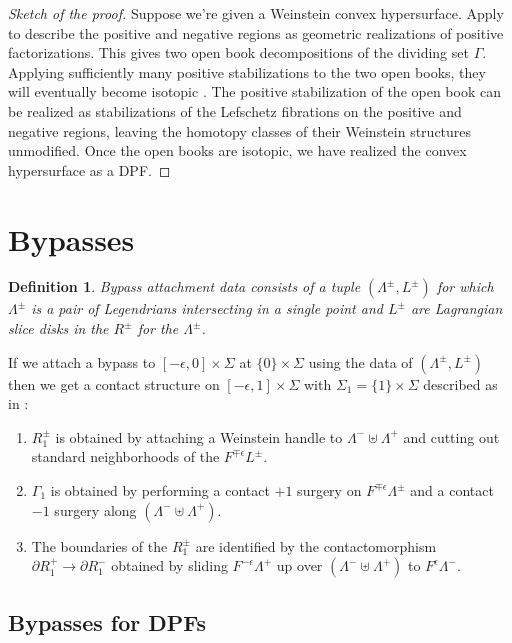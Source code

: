 \documentclass[11pt]{amsart}
\newcommand{\Leg}{\Lambda}
\newcommand{\be}{\begin{enumerate}}
\newcommand{\ee}{\end{enumerate}}
\newcommand{\hypersurface}{\Sigma}
\newcommand{\posRegion}{R^{+}}
\newcommand{\negRegion}{R^{-}}
\newcommand{\posNegRegion}{R^{\pm}}
\newcommand{\Lag}{L}
\newcommand{\posNegLag}{\Lag^{\pm}}
\newcommand{\posLeg}{\Leg^{+}}
\newcommand{\negLeg}{\Leg^{-}}
\newcommand{\posNegLeg}{\Leg^{\pm}}
\newcommand{\divSet}{\Gamma}
\newtheorem{defn}[thm]{Definition}
\begin{document}
\begin{proof}[Sketch of the proof]
Suppose we're given a Weinstein convex hypersurface. Apply \cite{BHH:GirouxCorrespondence, GirouxPardon} to describe the positive and negative regions as geometric realizations of positive factorizations. This gives two open book decompositions of the dividing set $\Gamma$. Applying sufficiently many positive stabilizations to the two open books, they will eventually become isotopic \cite{BHH:GirouxCorrespondence}. The positive stabilization of the open book can be realized as stabilizations of the Lefschetz fibrations on the positive and negative regions, leaving the homotopy classes of their Weinstein structures unmodified. Once the open books are isotopic, we have realized the convex hypersurface as a DPF.
\end{proof}

\section{Bypasses}

\begin{defn}
Bypass attachment data consists of a tuple $(\posNegLeg, \posNegLag)$ for which $\posNegLeg$ is a pair of Legendrians intersecting in a single point and $\posNegLag$ are Lagrangian slice disks in the $\posNegRegion$ for the $\posNegLeg$.
\end{defn}

If we attach a bypass to $[-\epsilon, 0] \times \hypersurface$ at $\{ 0 \} \times \hypersurface$ using the data of $(\posNegLeg, \posNegLag)$ then we get a contact structure on $[-\epsilon, 1] \times \hypersurface$ with $\hypersurface_{1} = \{1\} \times \hypersurface$ described as in \cite[Theorem 5.1.3]{HH:Bypass}:
\be
\item $\posNegRegion_{1}$ is obtained by attaching a Weinstein handle to $\negLeg \uplus \posLeg$ and cutting out standard neighborhoods of the $F^{\mp \epsilon}\posNegLag$.
\item $\divSet_{1}$ is obtained by performing a contact $+1$ surgery on $F^{\mp\epsilon}\posNegLeg$ and a contact $-1$ surgery along $(\negLeg \uplus \posLeg)$.
\item The boundaries of the $\posNegRegion_{1}$ are identified by the contactomorphism $\partial \posRegion_{1} \rightarrow \partial \negRegion_{1}$ obtained by sliding $F^{-\epsilon}\posLeg$ up over $(\negLeg \uplus \posLeg)$ to $F^{\epsilon}\negLeg$.
\ee

\subsection{Bypasses for DPFs}
\end{document}
